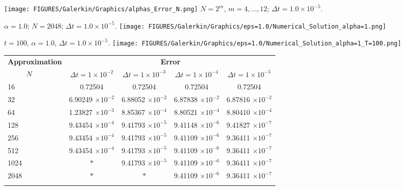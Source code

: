 \begin{frame}	
	\centering
	\texttt{[image: FIGURES/Galerkin/Graphics/alphas\_Error\_N.png]}
	$N = 2^m$, $m = 4, \dots, 12$; $\Delta t = 1.0 \times 10^{-5}$.
\end{frame}
\begin{frame}	
	$\alpha = 1.0$; $N=2048$; $\Delta t = 1.0 \times 10^{-5}$.
	\centering
	\texttt{[image: FIGURES/Galerkin/Graphics/eps=1.0/Numerical\_Solution\_alpha=1.png]}
\end{frame}
\begin{frame}
	$t = 100$, $\alpha = 1.0$, $\Delta t = 1.0 \times 10^{-5}$.
	\centering
	\texttt{[image: FIGURES/Galerkin/Graphics/eps=1.0/Numerical\_Solution\_alpha=1\_T=100.png]}
\end{frame}

\begin{frame}
\begin{table}
	\centering
	\begin{tabular}{lcccc}
		\toprule
		\multicolumn{1}{c}{\textbf{Approximation}} & \multicolumn{4}{c}{\textbf{Error}} \\
		$\hspace{9mm}N$ & $\Delta t=1\times 10^{-2}$ & $\Delta t=1\times 10^{-3}$ & $\Delta t=1\times 10^{-4}$ & $\Delta t=1\times 10^{-5}$ \\
		\midrule
		\hspace{7mm} 16 & 0.72504    & 0.72504    & 0.72504    & 0.72504    \\
		\midrule
		\hspace{7mm} 32 & 6.90249 $\times 10 ^{-2}$   & 6.88052 $\times 10 ^{-2}$   & 6.87838 $\times 10 ^{-2}$   & 6.87816 $\times 10 ^{-2}$   \\
		\midrule
		\hspace{7mm} 64 & 1.23827 $\times 10 ^{-3}$  & 8.85367 $\times 10 ^{-4}$ & 8.80521 $\times 10 ^{-4}$ & 8.80410 $\times 10 ^{-4}$  \\
		\midrule
		\hspace{7mm} 128 & 9.43454 $\times 10 ^{-4}$ & 9.41793 $\times 10 ^{-5}$ & 9.41148 $\times 10 ^{-6}$ & 9.41827 $\times 10 ^{-7}$  \\
		\midrule
		\hspace{7mm} 256 & 9.43454 $\times 10 ^{-4}$ & 9.41793 $\times 10 ^{-5}$ & 9.41109 $\times 10 ^{-6}$ & 9.36411 $\times 10 ^{-7}$ \\
		\midrule
		\hspace{7mm} 512 & 9.43454 $\times 10 ^{-4}$ & 9.41793 $\times 10 ^{-5}$ & 9.41109 $\times 10 ^{-6}$ & 9.36411 $\times 10 ^{-7}$ \\
		\midrule
		\hspace{7mm} 1024 & $\ast$ & 9.41793 $\times 10^{-5}$ & 9.41109 $\times 10^{-6}$ & 9.36411 $\times 10^{-7}$              \\
		\midrule
		\hspace{7mm} 2048 & $\ast$ & $\ast$ & 9.41109 $\times 10^{-6}$ & 9.36411 $\times 10^{-7}$   \\
		\\
		\bottomrule
	\end{tabular}
\end{table}
\end{frame}

